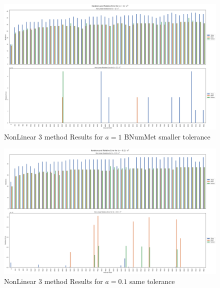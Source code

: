 \begin{figure}
    \centering
    \includegraphics[width=\textwidth]{Include/Images/Thesis/Analysis of Solutions/NonLinear AS/NonLinear 3 method Results Small Tol Bnum a-1.png}
    \caption{NonLinear 3 method Results for $a=1$ BNumMet smaller tolerance}
    \label{fig:NonLinear 3 method Results for a=1 BNumMet smaller tolerance}
\end{figure}

\begin{figure}
    \centering
    \includegraphics[width=\textwidth]{Include/Images/Thesis/Analysis of Solutions/NonLinear AS/NonLinear 3 method Results a-0.1.png}
    \caption{NonLinear 3 method Results for $a=0.1$ same tolerance}
    \label{fig:NonLinear 3 method Results for a=0.1 same tolerance}
\end{figure}

